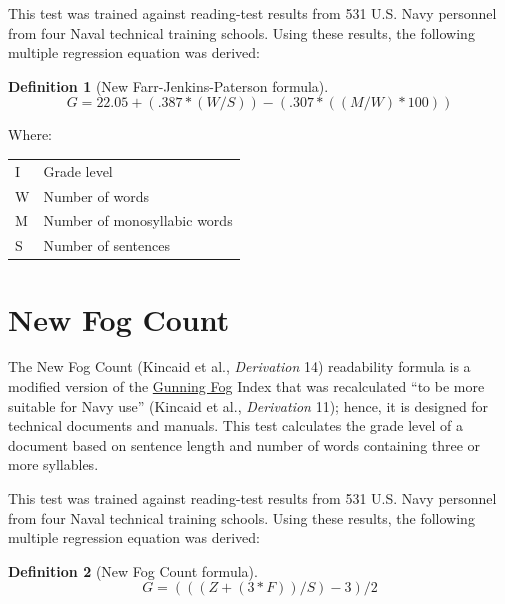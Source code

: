 \documentclass[
]{book}
\theoremstyle{definition}
\newtheorem{definition}{Definition}[chapter]
\theoremstyle{definition}
\theoremstyle{definition}
\theoremstyle{definition}
\theoremstyle{remark}
\begin{document}
This test was trained against reading-test results from 531 U.S. Navy personnel from four Naval technical training schools. Using these results, the following multiple regression equation was derived:

\begin{definition}[New Farr-Jenkins-Paterson formula]
\protect\hypertarget{def:newfjp}{}{\label{def:newfjp} {} }\[
G = 22.05 + (.387*(W/S)) - (.307*((M/W)*100))
\]
\end{definition}

Where:

\begin{longtable}[]{@{}
  >{\raggedright\arraybackslash}p{}
  >{\raggedright\arraybackslash}p{}@{}}
\toprule
\endhead
I & Grade level \\
W & Number of words \\
M & Number of monosyllabic words \\
S & Number of sentences \\
\bottomrule
\end{longtable}


\newpage

\hypertarget{new-fog-count-test}{%
\section{\texorpdfstring{New Fog Count}{New Fog Count}}\label{new-fog-count-test}}

The New Fog Count (Kincaid et al., \emph{Derivation} 14) readability formula is a modified version of the \protect\hyperlink{gunning-fog-test}{Gunning Fog} Index that was recalculated ``to be more suitable for Navy use'' (Kincaid et al., \emph{Derivation} 11); hence, it is designed for technical documents and manuals. This test calculates the grade level of a document based on sentence length and number of words containing three or more syllables.

This test was trained against reading-test results from 531 U.S. Navy personnel from four Naval technical training schools. Using these results, the following multiple regression equation was derived:

\begin{definition}[New Fog Count formula]
\protect\hypertarget{def:newfogcount}{}{\label{def:newfogcount} {} }\[
G = (((Z + (3*F)) / S ) - 3) / 2
\]
\end{definition}
\end{document}
